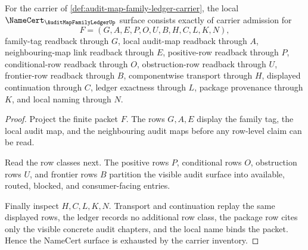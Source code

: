 \begin{theorem}
\label{thm:audit-map-family-ledger-obligations}
For the carrier of \autoref{def:audit-map-family-ledger-carrier}, the local $\NameCert_{\AuditMapFamilyLedgerUp}$ surface consists exactly of carrier admission for
$$
F=(G,A,E,P,O,U,B,H,C,L,K,N),
$$
family-tag readback through $G$, local audit-map readback through $A$, neighbouring-map link readback through $E$, positive-row readback through $P$, conditional-row readback through $O$, obstruction-row readback through $U$, frontier-row readback through $B$, componentwise transport through $H$, displayed continuation through $C$, ledger exactness through $L$, package provenance through $K$, and local naming through $N$.
\end{theorem}
\begin{proof}
Project the finite packet $F$. The rows $G,A,E$ display the family tag, the local audit map, and the neighbouring audit maps before any row-level claim can be read.

Read the row classes next. The positive rows $P$, conditional rows $O$, obstruction rows $U$, and frontier rows $B$ partition the visible audit surface into available, routed, blocked, and consumer-facing entries.

Finally inspect $H,C,L,K,N$. Transport and continuation replay the same displayed rows, the ledger records no additional row class, the package row cites only the visible concrete audit chapters, and the local name binds the packet. Hence the NameCert surface is exhausted by the carrier inventory.
\end{proof}

